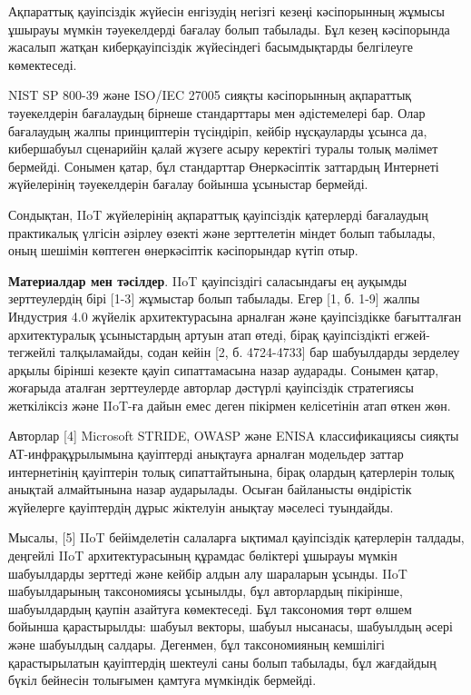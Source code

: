 \documentclass[
]{article}
\begin{document}
Ақпараттық қауіпсіздік жүйесін енгізудің негізгі кезеңі кәсіпорынның
жұмысы ұшырауы мүмкін тәуекелдерді бағалау болып табылады. Бұл кезең
кәсіпорында жасалып жатқан киберқауіпсіздік жүйесіндегі басымдықтарды
белгілеуге көмектеседі.

NIST SP 800-39 және ISO/IEC 27005 сияқты кәсіпорынның ақпараттық
тәуекелдерін бағалаудың бірнеше стандарттары мен әдістемелері бар. Олар
бағалаудың жалпы принциптерін түсіндіріп, кейбір нұсқауларды ұсынса да,
кибершабуыл сценарийін қалай жүзеге асыру керектігі туралы толық мәлімет
бермейді. Сонымен қатар, бұл стандарттар Өнеркәсіптік заттардың
Интернеті жүйелерінің тәуекелдерін бағалау бойынша ұсыныстар бермейді.

Сондықтан, IIoT жүйелерінің ақпараттық қауіпсіздік қатерлерді бағалаудың
практикалық үлгісін әзірлеу өзекті және зерттелетін міндет болып
табылады, оның шешімін көптеген өнеркәсіптік кәсіпорындар күтіп отыр.

\textbf{Материалдар мен тәсілдер}. IIoT қауіпсіздігі саласындағы ең
ауқымды зерттеулердің бірі {[}1-3{]} жұмыстар болып табылады. Егер {[}1,
б. 1-9{]} жалпы Индустрия 4.0 жүйелік архитектурасына арналған және
қауіпсіздікке бағытталған архитектуралық ұсыныстардың артуын атап өтеді,
бірақ қауіпсіздікті егжей-тегжейлі талқыламайды, содан кейін {[}2, б.
4724-4733{]} бар шабуылдарды зерделеу арқылы бірінші кезекте қауіп
сипаттамасына назар аударады. Сонымен қатар, жоғарыда аталған
зерттеулерде авторлар дәстүрлі қауіпсіздік стратегиясы жеткіліксіз және
IIoT-ға дайын емес деген пікірмен келісетінін атап өткен жөн.

Авторлар {[}4{]} Microsoft STRIDE, OWASP және ENISA классификациясы
сияқты АТ-инфрақұрылымына қауіптерді анықтауға арналған модельдер заттар
интернетінің қауіптерін толық сипаттайтынына, бірақ олардың қатерлерін
толық анықтай алмайтынына назар аударылады. Осыған байланысты өндірістік
жүйелерге қауіптердің дұрыс жіктелуін анықтау мәселесі туындайды.

Мысалы, {[}5{]} IIoT бейімделетін салаларға ықтимал қауіпсіздік
қатерлерін талдады, деңгейлі IIoT архитектурасының құрамдас бөліктері
ұшырауы мүмкін шабуылдарды зерттеді және кейбір алдын алу шараларын
ұсынды. IIoT шабуылдарының таксономиясы ұсынылды, бұл авторлардың
пікірінше, шабуылдардың қаупін азайтуға көмектеседі. Бұл таксономия төрт
өлшем бойынша қарастырылды: шабуыл векторы, шабуыл нысанасы, шабуылдың
әсері және шабуылдың салдары. Дегенмен, бұл таксономияның кемшілігі
қарастырылатын қауіптердің шектеулі саны болып табылады, бұл жағдайдың
бүкіл бейнесін толығымен қамтуға мүмкіндік бермейді.
\end{document}
